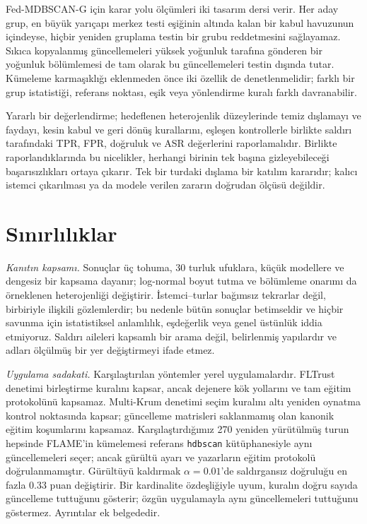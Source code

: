 \documentclass[journal]{IEEEtran}
\newcommand{\method}{Fed-MDBSCAN-G}
\begin{document}
\method{} için karar yolu ölçümleri iki tasarım dersi verir. Her aday grup, en büyük yarıçapı merkez testi eşiğinin altında kalan bir kabul havuzunun içindeyse, hiçbir yeniden gruplama testin bir grubu reddetmesini sağlayamaz. Sıkıca kopyalanmış güncellemeleri yüksek yoğunluk tarafına gönderen bir yoğunluk bölümlemesi de tam olarak bu güncellemeleri testin dışında tutar. Kümeleme karmaşıklığı eklenmeden önce iki özellik de denetlenmelidir; farklı bir grup istatistiği, referans noktası, eşik veya yönlendirme kuralı farklı davranabilir.

Yararlı bir değerlendirme; hedeflenen heterojenlik düzeylerinde temiz dışlamayı ve faydayı, kesin kabul ve geri dönüş kurallarını, eşleşen kontrollerle birlikte saldırı tarafındaki TPR, FPR, doğruluk ve ASR değerlerini raporlamalıdır. Birlikte raporlandıklarında bu nicelikler, herhangi birinin tek başına gizleyebileceği başarısızlıkları ortaya çıkarır. Tek bir turdaki dışlama bir katılım kararıdır; kalıcı istemci çıkarılması ya da modele verilen zararın doğrudan ölçüsü değildir.

\section{Sınırlılıklar}\label{sec:limits}
\emph{Kanıtın kapsamı.} Sonuçlar üç tohuma, 30 turluk ufuklara, küçük modellere ve dengesiz bir kapsama dayanır; log-normal boyut tutma ve bölümleme onarımı da örneklenen heterojenliği değiştirir. İstemci--turlar bağımsız tekrarlar değil, birbiriyle ilişkili gözlemlerdir; bu nedenle bütün sonuçlar betimseldir ve hiçbir savunma için istatistiksel anlamlılık, eşdeğerlik veya genel üstünlük iddia etmiyoruz. Saldırı aileleri kapsamlı bir arama değil, belirlenmiş yapılardır ve adları ölçülmüş bir yer değiştirmeyi ifade etmez.

\emph{Uygulama sadakati.} Karşılaştırılan yöntemler yerel uygulamalardır. FLTrust denetimi birleştirme kuralını kapsar, ancak dejenere kök yollarını ve tam eğitim protokolünü kapsamaz. Multi-Krum denetimi seçim kuralını altı yeniden oynatma kontrol noktasında kapsar; güncelleme matrisleri saklanmamış olan kanonik eğitim koşumlarını kapsamaz. Karşılaştırdığımız 270 yeniden yürütülmüş turun hepsinde FLAME'in kümelemesi referans \texttt{hdbscan} kütüphanesiyle aynı güncellemeleri seçer; ancak gürültü ayarı ve yazarların eğitim protokolü doğrulanmamıştır. Gürültüyü kaldırmak $\alpha=0.01$'de saldırgansız doğruluğu en fazla 0.33 puan değiştirir. Bir kardinalite özdeşliğiyle uyum, kuralın doğru sayıda güncelleme tuttuğunu gösterir; özgün uygulamayla aynı güncellemeleri tuttuğunu göstermez. Ayrıntılar ek belgededir.
\end{document}

